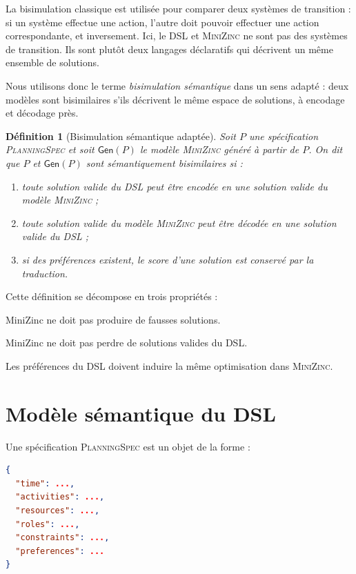 \documentclass[12pt,a4paper]{article}
\newtheorem{definition}{Définition}[section]
\newcommand{\DSL}{\textsc{PlanningSpec}}
\newcommand{\MZN}{\textsc{MiniZinc}}
\newcommand{\gen}{\mathsf{Gen}}
\begin{document}
La bisimulation classique est utilisée pour comparer deux systèmes de transition : si un système effectue une action, l'autre doit pouvoir effectuer une action correspondante, et inversement. Ici, le DSL et \MZN{} ne sont pas des systèmes de transition. Ils sont plutôt deux langages déclaratifs qui décrivent un même ensemble de solutions.

Nous utilisons donc le terme \emph{bisimulation sémantique} dans un sens adapté : deux modèles sont bisimilaires s'ils décrivent le même espace de solutions, à encodage et décodage près.

\begin{definition}[Bisimulation sémantique adaptée]
Soit $P$ une spécification \DSL{} et soit $\gen(P)$ le modèle \MZN{} généré à partir de $P$. On dit que $P$ et $\gen(P)$ sont sémantiquement bisimilaires si :
\begin{enumerate}[label=\arabic*)]
  \item toute solution valide du DSL peut être encodée en une solution valide du modèle \MZN{} ;
  \item toute solution valide du modèle \MZN{} peut être décodée en une solution valide du DSL ;
  \item si des préférences existent, le score d'une solution est conservé par la traduction.
\end{enumerate}
\end{definition}

Cette définition se décompose en trois propriétés :

\begin{description}[leftmargin=1.2cm]
  \item[Correction.] MiniZinc ne doit pas produire de fausses solutions.
  \item[Complétude.] MiniZinc ne doit pas perdre de solutions valides du DSL.
  \item[Préservation du score.] Les préférences du DSL doivent induire la même optimisation dans \MZN{}.
\end{description}

\section{Modèle sémantique du DSL}

Une spécification \DSL{} est un objet de la forme :

\begin{lstlisting}[language=JSON]
{
  "time": ...,
  "activities": ...,
  "resources": ...,
  "roles": ...,
  "constraints": ...,
  "preferences": ...
}
\end{lstlisting}
\end{document}
